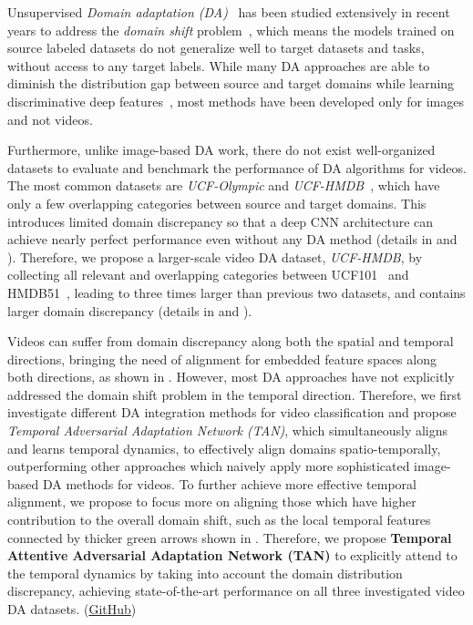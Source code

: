 \documentclass[10pt,twocolumn,letterpaper]{article}
\begin{document}
Unsupervised \textit{Domain adaptation (DA)}~\cite{csurka2017comprehensive} has been studied extensively in recent years to address the \textit{domain shift} problem~\cite{quionero2009dataset}, which means the models trained on source labeled datasets do not generalize well to target datasets and tasks, without access to any target labels.
While many DA approaches are able to diminish the distribution gap between source and target domains while learning discriminative deep features~\cite{ganin2015unsupervised, long2017deep, li2018adaptive, saito2018maximum}, most methods have been developed only for images and not videos.

Furthermore, unlike image-based DA work, 
there do not exist well-organized datasets to evaluate and benchmark the performance of DA algorithms for videos. 
The most common datasets are \textit{UCF-Olympic} and \textit{UCF-HMDB}~\cite{sultani2014human, xu2016dual, jamal2018deep}, which have only a few overlapping categories between source and target domains. 
This introduces limited domain discrepancy so that a deep CNN architecture can achieve nearly perfect performance even without any DA method (details in  and ).
Therefore, we propose a larger-scale video DA dataset, \textit{UCF-HMDB}, by collecting all relevant and overlapping categories between UCF101~\cite{soomro2012ucf101} and HMDB51~\cite{kuehne2011hmdb}, leading to three times larger than previous two datasets, and contains larger domain discrepancy (details in  and ). 

Videos can suffer from domain discrepancy along both the spatial and temporal directions, bringing the need of alignment for embedded feature spaces along both directions, as shown in . 
However, most DA approaches have not explicitly addressed the domain shift problem in the temporal direction.
Therefore, we first investigate different DA integration methods for video classification and 
propose \textit{Temporal Adversarial Adaptation Network (TAN)}, which simultaneously aligns and learns temporal dynamics, to effectively align domains spatio-temporally, outperforming other approaches which naively apply more sophisticated image-based DA methods for videos. 
To further achieve more effective temporal alignment, we propose to focus more on aligning those which have higher contribution to the overall domain shift, such as the local temporal features connected by thicker green arrows shown in .
Therefore, we propose \textbf{Temporal Attentive Adversarial Adaptation Network (TAN)} to explicitly attend to the temporal dynamics by taking into account the domain distribution discrepancy,
achieving state-of-the-art performance on all three investigated video DA datasets. (\href{http://github.com/cmhungsteve/TA3N}{GitHub})
\end{document}
